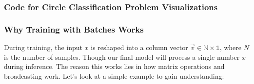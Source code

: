 \subsubsection{Code for Circle Classification Problem Visualizations}
\label{sec:circle-classification-visualizations}


\subsubsection{Why Training with Batches Works}
\label{sec:training-with-batches}
During training, the input $x$ is reshaped into a column vector $\vec{v}\in\mathbb{N\times 1}$, where $N$ is the number of samples. Though our final model will process a single number $x$ during inference. The reason this works lies in how matrix operations and broadcasting work. Let's look at a simple example to gain understanding:

